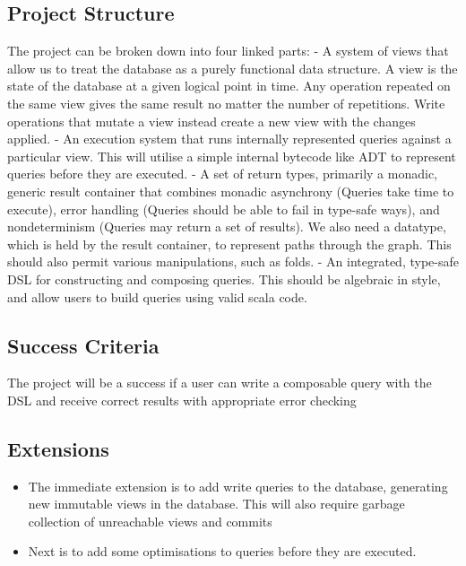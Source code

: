 \documentclass[12pt,a4paper,twoside,openright]{report}
\providecommand{\tightlist}{%
  \setlength{\itemsep}{0pt}\setlength{\parskip}{0pt}}
\begin{document}
\hypertarget{project-structure}{%
\subsection{Project Structure}\label{project-structure}}

The project can be broken down into four linked parts: - A system of
views that allow us to treat the database as a purely functional data
structure. A view is the state of the database at a given logical point
in time. Any operation repeated on the same view gives the same result
no matter the number of repetitions. Write operations that mutate a view
instead create a new view with the changes applied. - An execution
system that runs internally represented queries against a particular
view. This will utilise a simple internal bytecode like ADT to represent
queries before they are executed. - A set of return types, primarily a
monadic, generic result container that combines monadic asynchrony
(Queries take time to execute), error handling (Queries should be able
to fail in type-safe ways), and nondeterminism (Queries may return a set
of results). We also need a datatype, which is held by the result
container, to represent paths through the graph. This should also permit
various manipulations, such as folds. - An integrated, type-safe DSL for
constructing and composing queries. This should be algebraic in style,
and allow users to build queries using valid scala code.

\hypertarget{success-criteria}{%
\subsection{Success Criteria}\label{success-criteria}}

The project will be a success if a user can write a composable query
with the DSL and receive correct results with appropriate error checking

\hypertarget{extensions}{%
\subsection{Extensions}\label{extensions}}

\begin{itemize}
\tightlist
\item
  The immediate extension is to add write queries to the database,
  generating new immutable views in the database. This will also require
  garbage collection of unreachable views and commits
\item
  Next is to add some optimisations to queries before they are executed.
\end{itemize}
\end{document}
